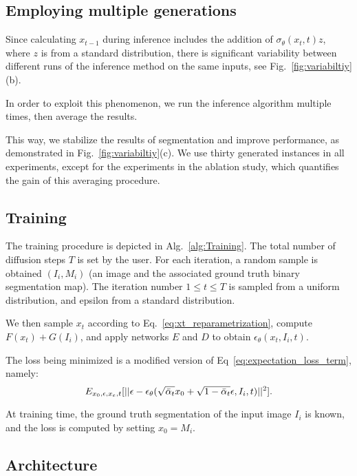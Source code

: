 \documentclass[10pt,twocolumn,letterpaper]{article}
\begin{document}
\subsection{Employing multiple generations}

Since calculating $x_{t-1}$ during inference includes the addition of $\sigma_\theta(x_t,t)z$, where $z$ is from a standard distribution, there is significant variability between different runs of the inference method on the same inputs, see Fig.~\ref{fig:variabiltiy}(b). 

In order to exploit this phenomenon, we run the inference algorithm multiple times, then average the results. 

This way, we stabilize the results of segmentation and improve performance, as demonstrated in Fig.~\ref{fig:variabiltiy}(c). We use thirty generated instances in all experiments, except for the experiments in the ablation study, which quantifies the gain of this averaging procedure.


\subsection{Training}

The training procedure is depicted in Alg.~\ref{alg:Training}. The total number of diffusion steps $T$ is set by the user. For each iteration, a random sample is obtained $(I_i,M_i)$ (an image and the associated ground truth binary segmentation map). The iteration number $1\leq t\leq T$ is sampled from a uniform distribution, and epsilon from a standard distribution. 

We then sample $x_t$ according to Eq.~\ref{eq:xt_reparametrization}, compute $F(x_t)+G(I_i)$, and apply networks $E$ and $D$ to obtain $\epsilon_\theta(x_t,I_i,t)$.

The loss being minimized is a modified version of Eq~\ref{eq:expectation_loss_term}, namely:
\begin{equation}
    E_{x_0,\epsilon,x_e,t}[||\epsilon-\epsilon_\theta(\sqrt{\Bar{\alpha}_t}x_0 + \sqrt{1-\Bar{\alpha}_t}\epsilon, I_i, t)||^2].
\label{eq:conditional_loss_term}
\end{equation}

At training time, the ground truth segmentation of the input image $I_i$ is known, and the loss is computed by setting $x_0 = M_i$.

\subsection{Architecture}
\end{document}
